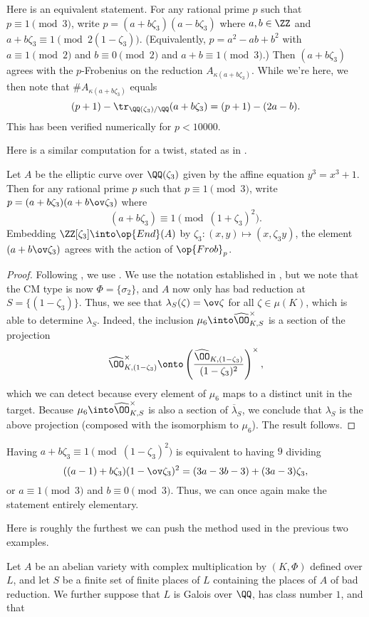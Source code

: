 \documentclass[../thesis.tex]{subfiles}
\begin{document}
\begin{remark} \label{rem:hecke-character-by-kernel-lambda}
	Here is an equivalent statement. For any rational prime $p$ such that $p\equiv1\pmod3$, write $p=(a+b\zeta_3)(a-b\zeta_3)$ where $a,b\in\ZZ$ and $a+b\zeta_3\equiv1\pmod{2(1-\zeta_3)}$. (Equivalently, $p=a^2-ab+b^2$ with $a\equiv1\pmod2$ and $b\equiv0\pmod2$ and $a+b\equiv1\pmod3$.) Then $(a+b\zeta_3)$ agrees with the $p$-Frobenius on the reduction $A_{\kappa(a+b\zeta_3)}$. While we're here, we then note that $\#A_{\kappa(a+b\zeta_3)}$ equals
	\[(p+1)-\tr_{\QQ(\zeta_3)/\QQ}(a+b\zeta_3)=(p+1)-(2a-b).\]
	This has been verified numerically for $p<10000$.
\end{remark}
Here is a similar computation for a twist, stated as in .
\begin{example}
	Let $A$ be the elliptic curve over $\QQ(\zeta_3)$ given by the affine equation $y^3=x^3+1$. Then for any rational prime $p$ such that $p\equiv1\pmod3$, write $p=(a+b\zeta_3)(a+b\ov\zeta_3)$ where
	\[(a+b\zeta_3)\equiv1\pmod{(1+\zeta_3)^2}.\]
	Embedding $\ZZ[\zeta_3]\into\op{End}(A)$ by $\zeta_3\colon(x,y)\mapsto(x,\zeta_3y)$, the element $(a+b\ov\zeta_3)$ agrees with the action of $\op{Frob}_p$.
\end{example}
\begin{proof}
	Following , we use . We use the notation established in , but we note that the CM type is now $\Phi=\{\sigma_2\}$, and $A$ now only has bad reduction at $S=\{(1-\zeta_3)\}$. Thus, we see that $\lambda_S(\zeta)=\ov\zeta$ for all $\zeta\in\mu(K)$, which is able to determine $\lambda_S$. Indeed, the inclusion $\mu_6\into\widehat\OO_{K,S}^\times$ is a section of the projection
	\[\widehat\OO_{K,(1-\zeta_3)}^\times\onto\left(\frac{\widehat\OO_{K,(1-\zeta_3)}}{(1-\zeta_3)^2}\right)^\times,\]
	which we can detect because every element of $\mu_6$ maps to a distinct unit in the target. Because $\mu_6\into\widehat\OO_{K,S}^\times$ is also a section of $\overline\lambda_S$, we conclude that $\lambda_S$ is the above projection (composed with the isomorphism to $\mu_6$). The result follows.
\end{proof}
\begin{remark}
	Having $a+b\zeta_3\equiv1\pmod{(1-\zeta_3)^2}$ is equivalent to having $9$ dividing
	\[((a-1)+b\zeta_3)(1-\ov\zeta_3)^2=(3a-3b-3)+(3a-3)\zeta_3,\]
	or $a\equiv1\pmod3$ and $b\equiv0\pmod3$. Thus, we can once again make the statement entirely elementary.
\end{remark}
Here is roughly the furthest we can push the method used in the previous two examples.
\begin{corollary}
	Let $A$ be an abelian variety with complex multiplication by $(K,\Phi)$ defined over $L$, and let $S$ be a finite set of finite places of $L$ containing the places of $A$ of bad reduction. We further suppose that $L$ is Galois over $\QQ$, has class number $1$, and that
\end{corollary}
\end{document}
